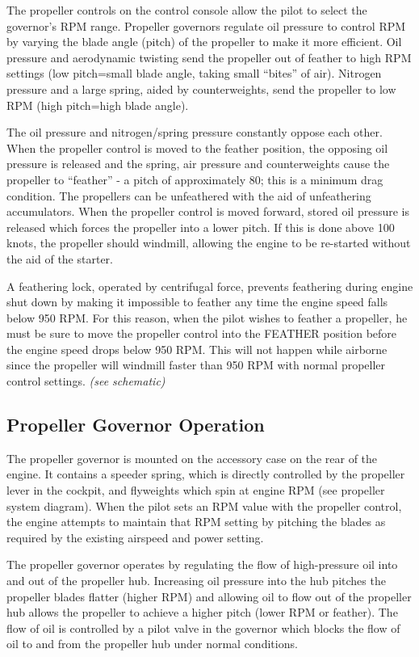 {The propeller controls on the control console allow the pilot to select the governor's RPM range. Propeller governors
regulate oil pressure to control RPM by varying the blade angle (pitch) of the propeller to make it more efficient.
Oil pressure and aerodynamic twisting send the propeller out of feather to high RPM settings (low pitch=small blade
angle, taking small ``bites'' of air). Nitrogen pressure and a large spring, aided by counterweights, send the propeller
to low RPM (high pitch=high blade angle).

The oil pressure and nitrogen/spring pressure constantly oppose each other. When the propeller control is moved to
the feather position, the opposing oil pressure is released and the spring, air pressure and counterweights cause the
propeller to ``feather'' - a pitch of approximately 80\degree; this is a minimum drag condition. The propellers can be
unfeathered with the aid of unfeathering accumulators. When the propeller control is moved forward, stored oil
pressure is released which forces the propeller into a lower pitch. If this is done above 100 knots, the propeller
should windmill, allowing the engine to be re-started without the aid of the starter.

A feathering lock, operated by centrifugal force, prevents feathering during engine shut down by making it
impossible to feather any time the engine speed falls below 950 RPM. For this reason, when the pilot wishes to
feather a propeller, he must be sure to move the propeller control into the FEATHER position before the engine
speed drops below 950 RPM. This will not happen while airborne since the propeller will windmill faster than 950
RPM with normal propeller control settings. \emph{(see schematic)}

\subsection{Propeller Governor Operation}

The propeller governor is mounted on the accessory case on the rear of the engine. It contains a speeder spring,
which is directly controlled by the propeller lever in the cockpit, and flyweights which spin at engine RPM (see
propeller system diagram). When the pilot sets an RPM value with the propeller control, the engine attempts to
maintain that RPM setting by pitching the blades as required by the existing airspeed and power setting.

The propeller governor operates by regulating the flow of high-pressure oil into and out of the propeller hub.
Increasing oil pressure into the hub pitches the propeller blades flatter (higher RPM) and allowing oil to flow out of
the propeller hub allows the propeller to achieve a higher pitch (lower RPM or feather). The flow of oil is controlled
by a pilot valve in the governor which blocks the flow of oil to and from the propeller hub under normal conditions.

}

